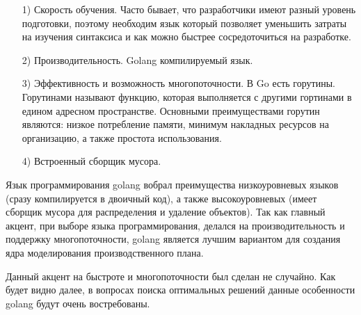 \begin{itemize}
    \item [1)] Скорость обучения. Часто бывает, что разработчики имеют разный уровень подготовки, поэтому необходим язык который позволяет уменьшить затраты на изучения синтаксиса и как можно быстрее сосредоточиться на разработке. 
    \item [2)] Производительность. Golang компилируемый язык\cite{golangBook}. 
    \item [3)] Эффективность и возможность многопоточности. В Go есть горутины. Горутинами называют функцию, которая выполняется с другими гортинами в едином адресном пространстве. Основными преимуществами горутин являются: низкое потребление памяти, минимум накладных ресурсов на организацию, а также простота использования.
    \item [4)] Встроенный сборщик мусора.
\end{itemize}

Язык программирования golang вобрал преимущества низкоуровневых языков (сразу компилируется в двоичный код), а также высокоуровневых (имеет сборщик мусора для распределения и удаление объектов). Так как главный акцент, при выборе языка программирования, делался на производительность и поддержку многопоточности, golang является лучшим вариантом для создания ядра моделирования производственного плана. 

Данный акцент на быстроте и многопоточности был сделан не случайно. Как будет видно далее, в вопросах поиска оптимальных решений данные особенности golang будут очень востребованы.